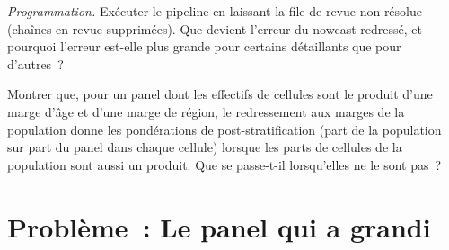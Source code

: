 \begin{exercise}[$\star\star\star$]\label{exo:ml:alternative-data-pipelines:7}
\emph{Programmation.} Exécuter le pipeline en laissant la file de revue non résolue (chaînes en revue supprimées). Que devient
l'erreur du nowcast redressé, et pourquoi l'erreur est-elle plus grande pour certains détaillants que pour d'autres~?
\end{exercise}

\begin{exercise}[$\star\star\star$]\label{exo:ml:alternative-data-pipelines:8}
Montrer que, pour un panel dont les effectifs de cellules sont le produit d'une marge d'âge et d'une marge de région, le redressement
aux marges de la population donne les pondérations de post-stratification (part de la population sur part du panel dans chaque cellule) lorsque les
parts de cellules de la population sont aussi un produit. Que se passe-t-il lorsqu'elles ne le sont pas~?
\end{exercise}

\section{Problème~: Le panel qui a grandi}

